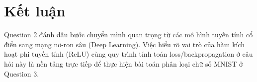 \documentclass[11pt, a4paper]{article}
\begin{document}
\section{Kết luận}
Question 2 đánh dấu bước chuyển mình quan trọng từ các mô hình tuyến tính cổ điển sang mạng nơ-ron sâu (Deep Learning). Việc hiểu rõ vai trò của hàm kích hoạt phi tuyến tính (ReLU) cùng quy trình tính toán loss/backpropagation ở câu hỏi này là nền tảng trực tiếp để thực hiện bài toán phân loại chữ số MNIST ở Question 3.
\end{document}
